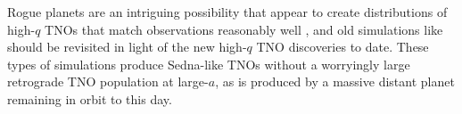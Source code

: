 \documentclass{aastex62}
\begin{document}
Rogue planets are an intriguing possibility that appear to create distributions of high-$q$ TNOs that match observations reasonably well \citep{lawler2018,silsbee18}, and old simulations like \citet{gladmanchan06} should be revisited in light of
the new high-$q$ TNO discoveries to date.  These types of simulations
produce Sedna-like TNOs without a worryingly large retrograde TNO population at large-$a$, as is produced by a massive distant planet remaining in orbit to this day.



% 



\end{document}
